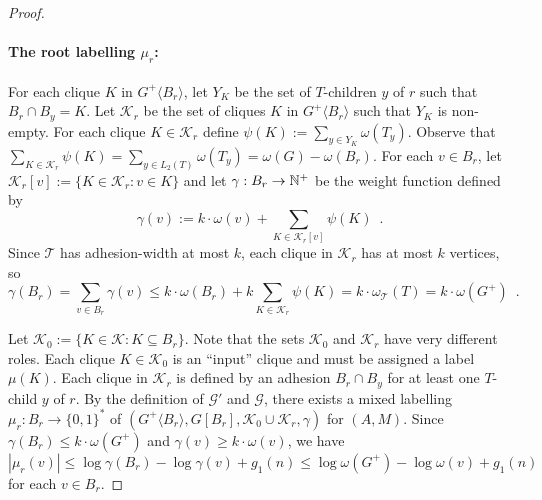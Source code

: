\documentclass{patmorin}
\renewcommand{\ge}{\geqslant}
\renewcommand{\le}{\leqslant}
\newcommand{\pat}[1]{\textcolor{Magenta}{PaMo: #1}}
\newcommand{\gwen}[1]{\textcolor{Purple}{GJ: #1}}
\newcommand{\piotr}[1]{\textcolor{red}{PiMi: #1}}
\newcommand{\torso}[2]{{#1}\langle{#2}\rangle}
\newcommand{\calG}{\mathcal{G}}
\newcommand{\calK}{\mathcal{K}}
\newcommand{\calT}{\mathcal{T}}
\begin{document}
\begin{proof}
    \paragraph{\boldmath The root labelling $\mu_r$:}
    For each clique $K$ in $\torso{G^+}{B_r}$, let $Y_K$ be the set of $T$-children $y$ of $r$ such that $B_r\cap B_y=K$.
    Let $\calK_r$ be the set of cliques $K$ in $\torso{G^+}{B_r}$ such that $Y_K$ is non-empty.
    For each clique $K\in\calK_r$ define 
    $\psi(K):=\sum_{y\in Y_K}\omega(T_y)$.  Observe that $\sum_{K\in\calK_r}\psi(K)=\sum_{y\in L_2(T)}\omega(T_y)=\omega(G)-\omega(B_r)$.
    For each $v\in B_r$, let $\calK_r[v]:=\{K\in\calK_r:v\in K\}$ and let $\gamma:B_r\to\mathbb{N}^+$ be the weight function defined by
    \[
       \gamma(v):=k\cdot\omega(v)+\sum_{K\in\calK_r[v]}\psi(K) \enspace .
    \]
    Since $\calT$ has adhesion-width at most $k$, each clique in $\calK_r$ has at most $k$ vertices, so
    \[
       \gamma(B_r)=\sum_{v\in B_r}\gamma(v)
       \le k\cdot\omega(B_r) + k\sum_{K\in\calK_r}\psi(K) = k\cdot\omega_{\calT}(T) = k\cdot\omega(G^+) \enspace .
    \]


    Let $\calK_0:=\{K\in\calK: K\subseteq B_r\}$.
    Note that the sets $\calK_0$ and $\calK_r$ have very different roles.
    Each clique $K\in\calK_0$ is an ``input'' clique and must be assigned a label $\mu(K)$.
    Each clique in $\calK_r$ is defined by an adhesion $B_r\cap B_y$ for at least one $T$-child $y$ of $r$.
    By the definition of $\calG'$ and $\calG$, 
    there exists a 
    mixed labelling $\mu_r:B_r\to\{0,1\}^*$ of $(\torso{G^+}{B_r}, G[B_r], \calK_0\cup\calK_r, \gamma)$ for $(A, M)$.  
    Since $\gamma(B_r)\le k\cdot\omega(G^+)$ and $\gamma(v)\ge k\cdot\omega(v)$, we have
    \[
       |\mu_r(v)|\le \log \gamma(B_r)-\log\gamma(v)+g_1(n)\le \log \omega(G^+) - \log \omega(v) + g_1(n) 
    \]
    for each $v\in B_r$.


\end{proof}
\end{document}
